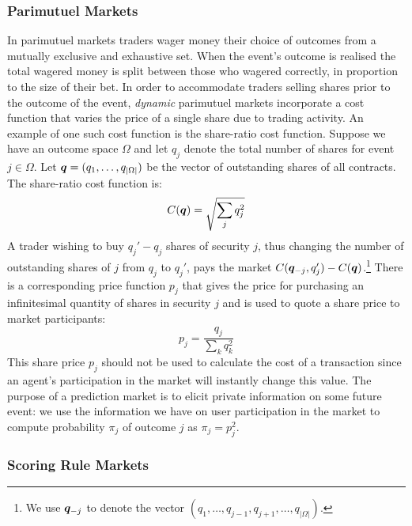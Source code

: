 \subsubsection{Parimutuel Markets}

In parimutuel markets traders wager money their choice of outcomes from a
mutually exclusive and exhaustive set. When the event's outcome is realised the
total wagered money is split between those who wagered correctly, in proportion
to the size of their bet. In order to accommodate traders selling shares prior
to the outcome of the event, \emph{dynamic} parimutuel markets incorporate a
cost function that varies the price of a single share due to trading activity.
An example of one such cost function is the share-ratio cost function. Suppose
we have an outcome space $\Omega$ and let $q_j$ denote the total number of
shares for event $j \in \Omega$. Let $\bm{q} = (q_1, \ldots, q_{|\Omega|})$
be the vector of outstanding shares of all contracts. The share-ratio cost
function is:
%
\[
	C(\bm{q}) = \sqrt{\sum_j q_j^2}
\]
%
A trader wishing to buy $q_j' - q_j$ shares of security $j$, thus changing the
number of outstanding shares of $j$ from $q_j$ to $q_j'$, pays the market
$C(\bm{q}_{-j}, q_j') - C(\bm{q})$.\footnote{We use $\bm{q}_{-j}$ to
denote the vector $(q_1, \ldots, q_{j-1}, q_{j+1}, \ldots, q_{|\Omega|})$.}
There is a corresponding price function $p_j$ that gives the price for
purchasing an infinitesimal quantity of shares in security $j$ and is used to
quote a share price to market participants:
%
\[
	p_j = \frac{q_j}{\sum_k q_k^2}
\]
%
This share price $p_j$ should not be used to calculate the cost of a
transaction since an agent's participation in the market will instantly change
this value. The purpose of a prediction market is to elicit private information
on some future event: we use the information we have on user participation in
the market to compute probability $\pi_j$ of outcome $j$ as $\pi_j = p_j^2$.

\subsubsection{Scoring Rule Markets}

